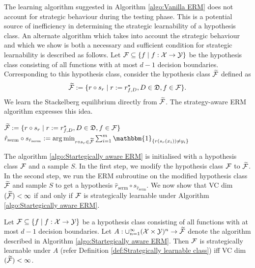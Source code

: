 The learning algorithm suggested in Algorithm \ref{algo:Vanilla ERM} does not account for strategic behaviour during the testing phase. This is a potential source of inefficiency in determining the strategic learnability of a hypothesis class. An alternate algorithm which takes into account the strategic behaviour and which we show is both a necessary and sufficient condition for strategic learnability is described as follows.
Let $\mathcal{F} \subseteq \{f \mid f:\mathcal{X} \rightarrow \mathcal{Y}\}$ be the hypothesis class consisting of all functions with at most $d-1$ decision boundaries. Corresponding to this hypothesis class, consider the hypothesis class $\widetilde{\mathcal{F}}$ defined as
\[
\widetilde{\mathcal{F}} := \{r \circ s_r \mid r := r^\star_{f,D}, D \in \mathfrak{D}, f \in \mathcal{F}\}.
\]
We learn the Stackelberg equilibrium directly from $\widetilde{\mathcal{F}}$. The strategy-aware ERM algorithm expresses this idea.
\begin{center}
	\begin{algorithm2e}[H]\label{algo:Startegically aware ERM}
		\SetAlgoLined
		\DontPrintSemicolon
		\BlankLine
		$\widetilde{\mathcal{F}} := \{r \circ s_r \mid r := r^\star_{f,D}, D \in \mathfrak{D}, f \in \mathcal{F}\}$  \;
		\BlankLine
		$\hat{r}_{\textrm{serm}}\circ s_{\hat{r}_{\textrm{serm}}}:= \argmin_{r \circ s_r \in \widetilde{\cg{F}}} \sum_{i=1}^m \mathbbm{1}_{\{r(s_r(x_i)) \neq y_i\}}$ \\
		
		\BlankLine
		
		\caption{Strategy aware ERM algorithm}
	\end{algorithm2e}
\end{center}
The algorithm \ref{algo:Startegically aware ERM} is initialised with a hypothesis class $\mathcal{F}$ and a sample $S$. In the first step, we modify the hypothesis class $\mathcal{F}$ to $\widetilde{\mathcal{F}}$. In the second step, we run the ERM subroutine on the modified hypothesis class $\widetilde{\mathcal{F}}$ and sample $S$ to get a hypothesis $\hat{r}_{\textrm{serm}}\circ s_{\hat{r}_{\textrm{serm}}}$. We now show that VC dim$(\widetilde{\mathcal{F}}) < \infty$ if and only if $\mathcal{F}$ is strategically learnable under Algorithm \ref{algo:Startegically aware ERM}. 

\begin{thm}\label{thm:Fundamental theorem of strategic learning}
Let $\mathcal{F} \subseteq \{ f \mid f: \mathcal{X} \rightarrow \mathcal{Y} \}$ be a hypothesis class consisting of all functions with at most $d-1$ decision boundaries. Let $A: \cup_{n=1}^\infty (\mathcal{X} \times \mathcal{Y})^n \rightarrow \widetilde{\mathcal{F}}$ denote the algorithm described in Algorithm \ref{algo:Startegically aware ERM}.  Then $\mathcal{F}$ is strategically learnable under $A$ (refer Definition \ref{def:Strategically learnable class}) iff VC dim$(\widetilde{\mathcal{F}}) < \infty$.
\end{thm}

